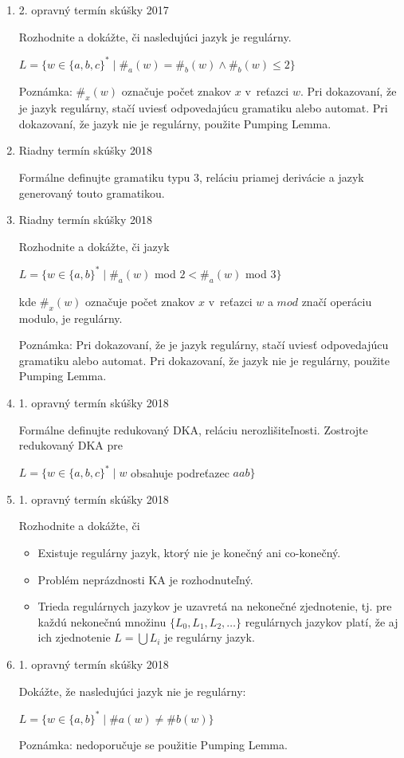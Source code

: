 \documentclass[11pt,a4paper]{article}
\begin{document}
\begin{enumerate}
		\item 2. opravný termín skúšky 2017

		Rozhodnite a dokážte, či nasledujúci jazyk je regulárny.

		$L = \{w \in \{a,b,c\}^* \mid \#_a(w) = \#_b(w) \land \#_b(w) \leq 2\}$

		Poznámka: $\#_x(w)$ označuje počet znakov $x$ v~reťazci $w$. Pri dokazovaní, že je jazyk regulárny, stačí uviesť odpovedajúcu gramatiku alebo automat. Pri dokazovaní, že jazyk nie je regulárny, použite Pumping Lemma.

		\item Riadny termín skúšky 2018

		Formálne definujte gramatiku typu 3, reláciu priamej derivácie a jazyk generovaný touto gramatikou.

		\item Riadny termín skúšky 2018

		Rozhodnite a dokážte, či jazyk

		$L = \{w \in \{a,b\}^* \mid \#_a(w)$ mod $2 < \#_a(w)$ mod $3\}$

		kde $\#_x(w)$ označuje počet znakov $x$ v~reťazci $w$ a $mod$ značí operáciu modulo, je regulárny.

		Poznámka: Pri dokazovaní, že je jazyk regulárny, stačí uviesť odpovedajúcu gramatiku alebo automat. Pri dokazovaní, že jazyk nie je regulárny, použite Pumping Lemma.

		\item 1. opravný termín skúšky 2018

		Formálne definujte redukovaný DKA, reláciu nerozlišiteľnosti. Zostrojte redukovaný DKA pre

		$L = \{w \in \{a,b,c\}^* \mid w$ obsahuje podreťazec $aab\}$

		\item 1. opravný termín skúšky 2018

		Rozhodnite a dokážte, či

		\begin{itemize}
			\item Existuje regulárny jazyk, ktorý nie je konečný ani co-konečný.
			\item Problém neprázdnosti KA je rozhodnuteľný.
			\item Trieda regulárnych jazykov je uzavretá na nekonečné zjednotenie, tj. pre každú nekonečnú množinu $\{L_0, L_1, L_2, \ldots\}$ regulárnych jazykov platí, že aj ich zjednotenie $L = \bigcup L_i$ je regulárny jazyk.
		\end{itemize}

		 \item 1. opravný termín skúšky 2018

		 Dokážte, že nasledujúci jazyk nie je regulárny:

		 $L = \{w \in \{a,b\}^* \mid \#a(w) \neq \#b(w)\}$

		 Poznámka: nedoporučuje se použitie Pumping Lemma.


	\end{enumerate}
\end{document}
